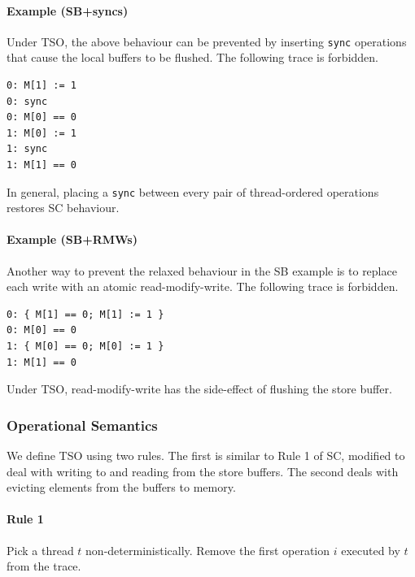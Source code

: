 \documentclass[11pt]{article}
\begin{document}
\paragraph{Example (SB+syncs)}  Under TSO, the above behaviour can be
prevented by inserting \verb!sync! operations that cause the local
buffers to be flushed.  The following trace is forbidden.

\begin{verbatim}
0: M[1] := 1
0: sync
0: M[0] == 0
1: M[0] := 1
1: sync
1: M[1] == 0
\end{verbatim}

\noindent In general, placing a \verb!sync! between every pair of
thread-ordered operations restores SC behaviour.

\paragraph{Example (SB+RMWs)} Another way to prevent the
relaxed behaviour in the SB example is to replace each write with an
atomic read-modify-write.  The following trace is forbidden.

\begin{verbatim}
0: { M[1] == 0; M[1] := 1 }
0: M[0] == 0
1: { M[0] == 0; M[0] := 1 }
1: M[1] == 0
\end{verbatim}

\noindent Under TSO, read-modify-write has the side-effect of
flushing the store buffer.

\subsubsection*{Operational Semantics}

We define TSO using two rules.  The first is similar to Rule 1 of SC,
modified to deal with writing to and reading from the store buffers.
The second deals with evicting elements from the buffers to memory.

\paragraph{Rule 1}

Pick a thread $t$ non-deterministically.  Remove the first operation
$i$ executed by $t$ from the trace.
\end{document}
